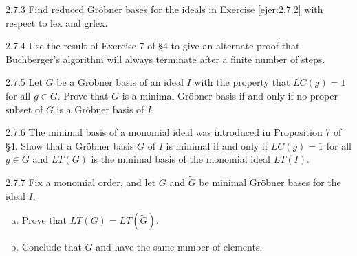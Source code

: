 \documentclass[twoside]{article}
\begin{document}
\begin{ejercicio}{2.7.3}
Find reduced Gröbner bases for the ideals in Exercise \ref{ejer:2.7.2} with respect to lex and grlex.
\end{ejercicio}
\begin{solucion}

\end{solucion}

\newpage

\begin{ejercicio}{2.7.4}
Use the result of Exercise 7 of §4 to give an alternate proof that Buchberger’s algorithm
will always terminate after a finite number of steps.
\end{ejercicio}
\begin{solucion}

\end{solucion}
\newpage

\begin{ejercicio}{2.7.5}
Let $G$ be a Gröbner basis of an ideal $I$ with the property that $LC (g) = 1$ for all $g ∈ G$.
Prove that $G$ is a minimal Gröbner basis if and only if no proper subset of $G$ is a Gröbner
basis of $I$.
\end{ejercicio}
\begin{solucion}

\end{solucion}

\newpage

\begin{ejercicio}{2.7.6}
The minimal basis of a monomial ideal was introduced in Proposition 7 of §4. Show that
a Gröbner basis $G$ of $I$ is minimal if and only if $LC (g) = 1$ for all $g ∈ G$ and $LT (G)$ is
the minimal basis of the monomial ideal $LT (I)$.
\end{ejercicio}
\begin{solucion}

\end{solucion}

\newpage

\begin{ejercicio}{2.7.7}
Fix a monomial order, and let $G$ and $\tilde{G}$ be minimal Gröbner bases for the ideal $I$.
\begin{enumerate}[a.]
\item Prove that $LT (G) = LT (\tilde{G})$.
\item Conclude that $G$ and have the same number of elements.
\end{enumerate}
\end{ejercicio}
\begin{solucion}

\end{solucion}
\end{document}
